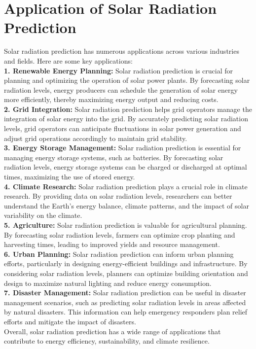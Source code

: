 \documentclass[12pt,a4paper]{report}
\begin{document}
\chapter{Application of Solar Radiation Prediction} 
Solar radiation prediction has numerous applications across various industries and fields. Here are some key applications: \\
\textbf{1. Renewable Energy Planning:} Solar radiation prediction is crucial for planning and 
optimizing the operation of solar power plants. By forecasting solar radiation levels, 
energy producers can schedule the generation of solar energy more efficiently, thereby 
maximizing energy output and reducing costs. \\
\textbf{2. Grid Integration:} Solar radiation prediction helps grid operators manage the 
integration of solar energy into the grid. By accurately predicting solar radiation 
levels, grid operators can anticipate fluctuations in solar power generation and adjust 
grid operations accordingly to maintain grid stability. \\
\textbf{3. Energy Storage Management:} Solar radiation prediction is essential for managing 
energy storage systems, such as batteries. By forecasting solar radiation levels, energy 
storage systems can be charged or discharged at optimal times, maximizing the use of 
stored energy. \\
\textbf{4. Climate Research:} Solar radiation prediction plays a crucial role in climate 
research. By providing data on solar radiation levels, researchers can better understand 
the Earth's energy balance, climate patterns, and the impact of solar variability on the 
climate. \\
\textbf{5. Agriculture:} Solar radiation prediction is valuable for agricultural planning. By 
forecasting solar radiation levels, farmers can optimize crop planting and harvesting 
times, leading to improved yields and resource management. \\
\textbf{6. Urban Planning:} Solar radiation prediction can inform urban planning efforts, 
particularly in designing energy-efficient buildings and infrastructure. By considering 
solar radiation levels, planners can optimize building orientation and design to 
maximize natural lighting and reduce energy consumption.\\ 
\textbf{7. Disaster Management:} Solar radiation prediction can be useful in disaster 
management scenarios, such as predicting solar radiation levels in areas affected by 
natural disasters. This information can help emergency responders plan relief efforts 
and mitigate the impact of disasters. \\
Overall, solar radiation prediction has a wide range of applications that contribute to 
energy efficiency, sustainability, and climate resilience. 
\end{document}
